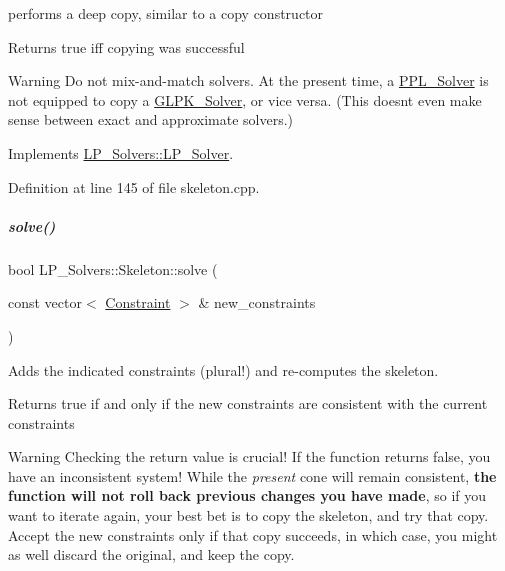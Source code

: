 performs a deep copy, similar to a copy constructor 

\begin{DoxyReturn}{Returns}
{\ttfamily true} iff copying was successful 
\end{DoxyReturn}
\begin{DoxyWarning}{Warning}
Do not mix-\/and-\/match solvers. At the present time, a \hyperlink{group___c_l_s_solvers_class_l_p___solvers_1_1_p_p_l___solver}{P\+P\+L\+\_\+\+Solver} is not equipped to copy a \hyperlink{group___c_l_s_solvers_class_l_p___solvers_1_1_g_l_p_k___solver}{G\+L\+P\+K\+\_\+\+Solver}, or vice versa. (This doesn\textquotesingle{}t even make sense between exact and approximate solvers.) 
\end{DoxyWarning}


Implements \hyperlink{group___c_l_s_solvers_a36c14a88e9d3ae9d9321acc7877236d0}{L\+P\+\_\+\+Solvers\+::\+L\+P\+\_\+\+Solver}.



Definition at line 145 of file skeleton.\+cpp.

\mbox{\label{group___c_l_s_solvers_aba082a338a2cb3ace612fd2dfba667c5}} 
\subparagraph{\texorpdfstring{solve()}{solve()}\hspace{0.1cm}{\footnotesize\ttfamily [1/2]}}
{\footnotesize\ttfamily bool L\+P\+\_\+\+Solvers\+::\+Skeleton\+::solve (\begin{DoxyParamCaption}\item[{const vector$<$ \hyperlink{group___c_l_s_solvers_class_l_p___solvers_1_1_constraint}{Constraint} $>$ \&}]{new\+\_\+constraints }\end{DoxyParamCaption})\hspace{0.3cm}{\ttfamily [virtual]}}



Adds the indicated constraints (plural!) and re-\/computes the skeleton. 

\begin{DoxyReturn}{Returns}
{\ttfamily true} if and only if the new constraints are consistent with the current constraints
\end{DoxyReturn}
\begin{DoxyWarning}{Warning}
Checking the return value is crucial! If the function returns {\ttfamily false}, you have an inconsistent system! While the {\itshape present} cone will remain consistent, {\bfseries the function will not roll back previous changes you have made}, so if you want to iterate again, your best bet is to copy the skeleton, and try that copy. Accept the new constraints only if that copy succeeds, in which case, you might as well discard the original, and keep the copy. 
\end{DoxyWarning}



